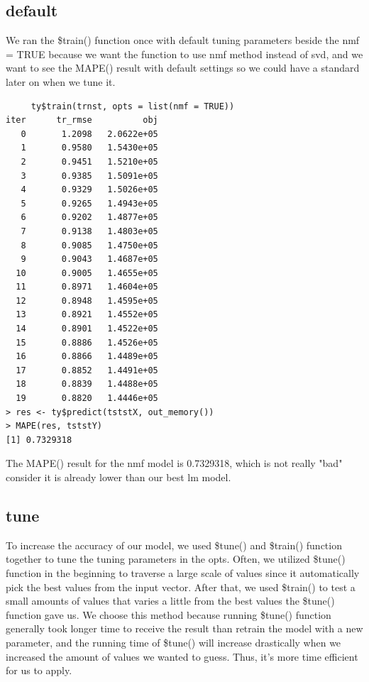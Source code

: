 \documentclass[11pt]{article}
\newcommand\tab[1][0.5cm]{\hspace*{#1}}
\begin{document}
\subsection{default}
\tab{}We ran the \$train() function once with default tuning parameters beside the nmf = TRUE because we want the function to use nmf method instead of svd, and we want to see the MAPE() result with default settings so we could have a standard later on when we tune it.
\begin{verbatim}
     ty$train(trnst, opts = list(nmf = TRUE))
iter      tr_rmse          obj
   0       1.2098   2.0622e+05
   1       0.9580   1.5430e+05
   2       0.9451   1.5210e+05
   3       0.9385   1.5091e+05
   4       0.9329   1.5026e+05
   5       0.9265   1.4943e+05
   6       0.9202   1.4877e+05
   7       0.9138   1.4803e+05
   8       0.9085   1.4750e+05
   9       0.9043   1.4687e+05
  10       0.9005   1.4655e+05
  11       0.8971   1.4604e+05
  12       0.8948   1.4595e+05
  13       0.8921   1.4552e+05
  14       0.8901   1.4522e+05
  15       0.8886   1.4526e+05
  16       0.8866   1.4489e+05
  17       0.8852   1.4491e+05
  18       0.8839   1.4488e+05
  19       0.8820   1.4446e+05
> res <- ty$predict(tststX, out_memory())
> MAPE(res, tststY)
[1] 0.7329318
\end{verbatim}

\tab{}The MAPE() result for the nmf model is 0.7329318, which is not really "bad" consider it is already lower than our best lm model.

\subsection{tune}
\tab{} To increase the accuracy of our model, we used \$tune() and \$train() function together to tune the tuning parameters in the opts. Often, we utilized \$tune() function in the beginning to traverse a large scale of values since it automatically pick the best values from the input vector. After that, we used \$train() to test a small amounts of values that varies a little from the best values the \$tune() function gave us. We choose this method because running \$tune() function generally took longer time to receive the result than retrain the model with a new parameter, and the running time of \$tune() will increase drastically when we increased the amount of values we wanted to guess. Thus, it's more time efficient for us to apply.
\end{document}
